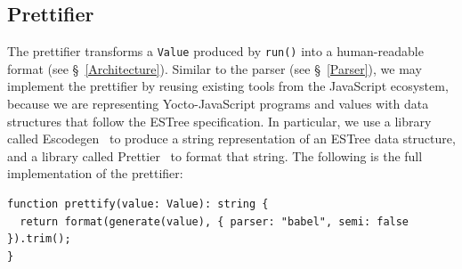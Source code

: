 \documentclass[12pt, oneside]{book}
\begin{document}
\subsection{Prettifier}
\label{Step 0: Prettifier}

The prettifier transforms a \texttt{Value} produced by \texttt{run()} into a human-readable format (see §~\ref{Architecture}). Similar to the parser (see §~\ref{Parser}), we may implement the prettifier by reusing existing tools from the JavaScript ecosystem, because we are representing Yocto-JavaScript programs and values with data structures that follow the ESTree specification. In particular, we use a library called Escodegen~\cite{escodegen} to produce a string representation of an ESTree data structure, and a library called Prettier~\cite{prettier} to format that string. The following is the full implementation of the prettifier:

\begin{verbatim}
function prettify(value: Value): string {
  return format(generate(value), { parser: "babel", semi: false }).trim();
}
\end{verbatim}




\backmatter




\end{document}
